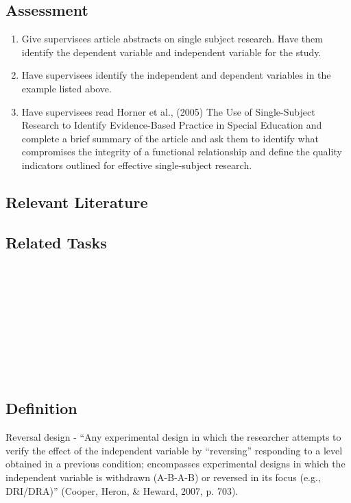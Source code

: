 \subsection{Assessment}
\begin{enumerate}
\item Give supervisees article abstracts on single subject research. Have them identify the dependent variable and independent variable for the study.
\item Have supervisees identify the independent and dependent variables in the example listed above.
\item Have supervisees read Horner et al., (2005) The Use of Single-Subject Research to Identify Evidence-Based Practice in Special Education and complete a brief summary of the article and ask them to identify what compromises the integrity of a functional relationship and define the quality indicators outlined for effective single-subject research.
\end{enumerate}
%
\subsection{Relevant Literature} 
\begin{refsection}
\nocite{cooper2007applied,horner2005use}
\printbibliography[heading=none]
\end{refsection}%

\subsection{Related Tasks}
\fourbFour{}\\
\fourbFive{}\\
\fourbSix{}\\
\fourbSeven{}\\
\fourbNine{}\\
\fourbEleven{}\\ 
\fourhFour{}\\
\fouriOne{}\\
%
%
%
%
%
%            
\section{\fourbFour{}}
\subsection{Definition}
Reversal design - ``Any experimental design in which the researcher attempts to verify the effect of the independent variable by ``reversing'' responding to a level obtained in a previous condition; encompasses experimental designs in which the independent variable is withdrawn (A-B-A-B) or reversed in its focus (e.g., DRI/DRA)'' (Cooper, Heron, \& Heward, 2007, p. 703).

